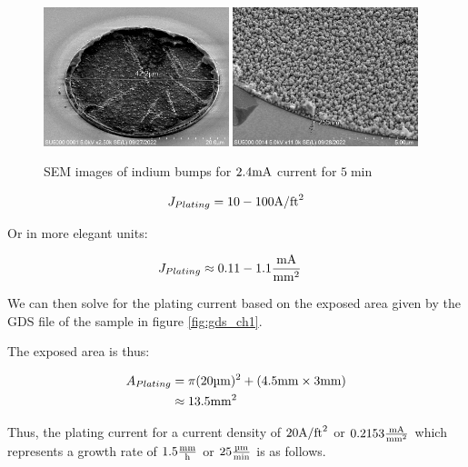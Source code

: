 \begin{figure}[t]
    \centering
    \includegraphics[width=0.48\textwidth]{Main/Ch1/24mA_Growth1.png}
    \includegraphics[width=0.48\textwidth]{Main/Ch1/24mA_Growth2.png}
    \caption{SEM images of indium bumps for $2.4 \mA$ current for $5 \unit{\min}$}
    \label{fig:24mAGrowth}
\end{figure}


$$
    J_{Plating} = 10-100 \jufeet
$$

Or in more elegant units:

\begin{equation}\notag
    \begin{split}
        J_{Plating} &\approx 0.11-1.1 \junits
    \end{split}
\end{equation}


We can then solve for the plating current based on the exposed area given by the GDS file of the sample in figure \ref{fig:gds_ch1}.


The exposed area is thus:

\begin{equation}\notag
    \begin{split}
        A_{Plating} &= \pi (20 \um)^2 + (4.5 \mm \times 3 \mm) \\
        &\approx 13.5 \sqmm
    \end{split}
\end{equation}

Thus, the plating current for a current density of $20\jufeet$ or $0.2153 \junits$ which represents a growth rate of $1.5\mmph $ or $25 \umpm$ is as follows.


